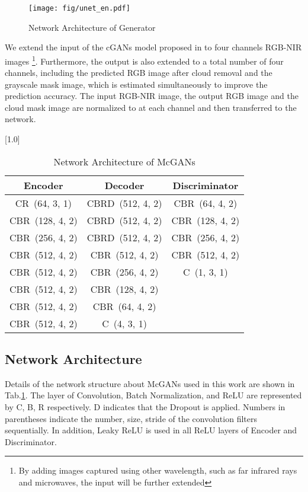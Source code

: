 \documentclass[10pt,twocolumn,letterpaper]{article}
\begin{document}
\begin{figure*}[htpb]
\begin{center}
\hspace*{0mm}\texttt{[image: fig/unet\_en.pdf]}
\caption{Network Architecture of Generator}
\label{fig:generator}
\end{center}
\end{figure*}

We extend the input of the cGANs model proposed in \cite{isola2016image} to four channels RGB-NIR images \footnote{By adding images captured using other wavelength, such as far infrared rays and microwaves, the input will be further extended}. Furthermore, the output is also extended to a total number of four channels, including the predicted RGB image after cloud removal and the grayscale mask image, which is estimated simultaneously to improve the prediction accuracy.
The input RGB-NIR image, the output RGB image and the cloud mask image are normalized to  at each channel and then transferred to the network.

\begin{table}[tb]
\begin{center}
\caption{Network Architecture of McGANs\label{tab:CNN_Structure}}{
\scalebox{1.0}[1.0]{
\begin{tabular}{c|c|c}
\hline
Encoder & Decoder & Discriminator\\ \hline
CR~(64, 3, 1)  & CBRD~(512, 4, 2) & CBR~(64, 4, 2) \\
CBR~(128, 4, 2) & CBRD~(512, 4, 2) & CBR~(128, 4, 2)\\ 
CBR~(256, 4, 2) & CBRD~(512, 4, 2) & CBR~(256, 4, 2)\\ 
CBR~(512, 4, 2) & CBR~(512, 4, 2) & CBR~(512, 4, 2)\\
CBR~(512, 4, 2) & CBR~(256, 4, 2) & C~(1, 3, 1)\\
CBR~(512, 4, 2) & CBR~(128, 4, 2) & \\
CBR~(512, 4, 2) & CBR~(64, 4, 2) & \\
CBR~(512, 4, 2) & C~(4, 3, 1) & \\ \hline
\end{tabular} 
}
}
\end{center}
\end{table}

\subsection*{Network Architecture}
Details of the network structure about McGANs used in this work are shown in Tab.\ref{tab:CNN_Structure}.
The layer of Convolution, Batch Normalization, and ReLU are represented by C, B, R respectively. D indicates that the Dropout is applied.
Numbers in parentheses indicate the number, size, stride of the convolution filters sequentially. In addition, Leaky ReLU is used in all ReLU layers of Encoder and Discriminator.
\end{document}
